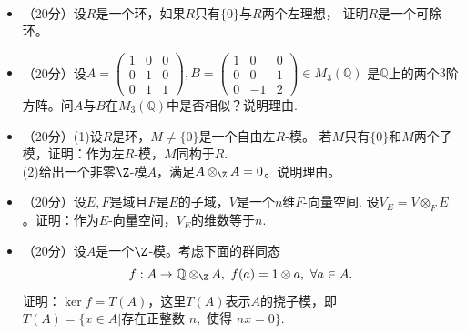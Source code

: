 ~\\
\begin{center}
\end{center}
\begin{itemize}
\item[1.]（20分）设$R$是一个环，如果$R$只有$\{0\}$与$R$两个左理想，
证明$R$是一个可除环。

\item[2.]（20分）设$A=\begin{pmatrix}1&0&0\\0&1&0\\0&1&1\end{pmatrix},
B=\begin{pmatrix}1&0&0\\0&0&1\\0&-1&2\end{pmatrix}\in M_3(\mathbb{Q})$
是$\mathbb{Q}$上的两个$3$阶方阵。问$A$与$B$在$M_3(\mathbb{Q})$中是否相似？说明理由.

\item[3.]（20分）(1)设$R$是环，$M\ne\{0\}$是一个自由左$R$-模。
若$M$只有$\{0\}$和$M$两个子模，证明：作为左$R$-模，$M$同构于$R$.\\
(2)给出一个非零$\Z$-模$A$，满足$A\otimes_\Z A=0$。说明理由。

\item[4.]（20分）设$E,F$是域且$F$是$E$的子域，$V$是一个$n$维$F$-向量空间.
设$V_E=V\otimes_F E$。证明：作为$E$-向量空间，$V_E$的维数等于$n$.\\

\item[5.]（20分）设$A$是一个$\Z$-模。考虑下面的群同态
$$f:A\to\mathbb{Q}\otimes_\Z A,\ f(a)=1\otimes a,\ \forall a\in A.$$
证明：$\ker f=T(A)$，这里$T(A)$表示$A$的挠子模，即
$T(A)=\{x\in A|\text{存在正整数 }n,\text{ 使得 }nx=0\}$.
\end{itemize}

